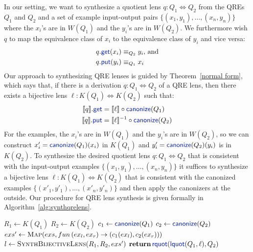 \documentclass[acmsmall,screen]{acmart}
\newcommand{\kw}[1]{\textcolor{dkblue}{\ensuremath{\mathsf{#1}}}}
\newcommand{\canonize}{\ensuremath{\kw{canonize}}}
\newcommand{\get}{\ensuremath{\kw{get}}}
\newcommand{\lput}{\ensuremath{\kw{put}}}
\newcommand{\lquot}{\ensuremath{\kw{lquot}}}
\newcommand{\rquot}{\ensuremath{\kw{rquot}}}
\begin{document}
In our setting, we want to synthesize a quotient lens $q: Q_1 \Leftrightarrow
Q_2$ from the QREs $Q_1$ and $Q_2$ and a set of example input-output pairs
$\{(x_1, y_1),\allowbreak \ldots,\allowbreak (x_n, y_n)\}$ where the $x_i$'s are
in $W(Q_1)$ and the $y_i$'s are in $W(Q_2)$. We furthermore wish $q$ to map the
equivalence class of $x_i$ to the equivalence class of $y_i$ and vice versa:
\begin{align*}
q.\get(x_i) &\equiv_{Q_2} y_i \text{, and}\\
q.\lput(y_i) &\equiv_{Q_1} x_i
\end{align*}
Our approach to synthesizing QRE lenses is guided by Theorem~\ref{normal form},
which says that, if there is a derivation $q : Q_1 \Leftrightarrow Q_2$ of a
QRE lens, then there exists a bijective lens $\ell : K(Q_1) \Leftrightarrow
K(Q_2)$ such that:
\begin{align*}
\llbracket q \rrbracket.\get &= \llbracket \ell \rrbracket\circ \canonize(Q_1)\\
\llbracket q \rrbracket.\lput &= \llbracket \ell \rrbracket^{-1} \circ
\canonize(Q_2)
\end{align*}
For the examples, the $x_i$'s are in $W(Q_1)$ and the $y_i$'s are 
in $W(Q_2)$, so we can construct ${x'_i} = \canonize(Q_1)(x_i)$ in $K(Q_1)$
and ${y'_i} = \canonize(Q_2)(y_i)$ is in $K(Q_2)$. To synthesize the desired
quotient lens $q: Q_1 \Leftrightarrow Q_2$ that is consistent with the
input-output examples $\{(x_1, y_1), \ldots, (x_n, y_n)\}$ it suffices to
synthesize a bijective lens $\ell : K(Q_1) \Leftrightarrow K(Q_2)$ that is
consistent with the canonized examples $\{({x'_1}, {y'_1}), \ldots, ({x'_n},
{y'_n})\}$ and then apply the canonizers at the outside. Our procedure for QRE
lens synthesis is given formally in Algorithm~\ref{alg:synthqrelens}.

\begin{algorithm}
  \caption{}
  \label{alg:synthqrelens}
  \begin{algorithmic}[1]
    \State $R_1 \gets K(Q_1)$
    \State $R_2 \gets K(Q_2)$
    \State $c_1 \gets \canonize(Q_1)$
    \State $c_2 \gets \canonize(Q_2)$
    \State $exs' \gets \Call{Map}{exs,fun \, (ex_l,ex_r) \to
      (c_1(ex_l),c_2(ex_r))}$
    \State $l \gets \Call{SynthBijectiveLens}{R_1,R_2,exs'}$
    \State $\Return \, \rquot(\lquot(Q_1, \ell), Q_2)$
    \EndFunction
  \end{algorithmic}
\end{algorithm}
\end{document}
